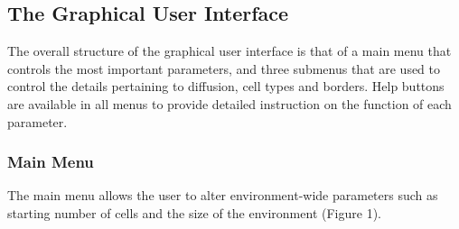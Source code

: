 \documentclass[12pt]{article}
\begin{document}
\subsection{The Graphical User Interface}
The overall structure of the graphical user interface is that of a main 
menu that controls the most important parameters, and three submenus 
that are used to control the details pertaining to diffusion, cell types 
and borders. Help buttons are available in all menus to provide 
detailed instruction on the function of each parameter.

\subsubsection{Main Menu}
The main menu allows the user to alter environment-wide parameters such 
as starting number of cells and the size of the environment (Figure 1). 
\end{document}
